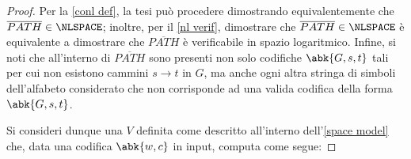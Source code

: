 \documentclass[a4paper, 12pt]{report}
\begin{document}
    \begin{proof}
        Per la \cref{conl def}, la tesi può procedere dimostrando equivalentemente che $\overline{PATH} \in \NLSPACE$; inoltre, per il \cref{nl verif}, dimostrare che $\overline{PATH} \in \NLSPACE$ è equivalente a dimostrare che $\overline{PATH}$ è verificabile in spazio logaritmico. Infine, si noti che all'interno di $\overline{PATH}$ sono presenti non solo codifiche $\abk{G, s, t}$ tali per cui non esistono cammini $s \to t$ in $G$, ma anche ogni altra stringa di simboli dell'alfabeto considerato che non corrisponde ad una valida codifica della forma $\abk{G, s, t}$. 

        Si consideri dunque una \TM $V$ definita come descritto all'interno dell'\cref{space model} che, data una codifica $\abk{w, c}$ in input, computa come segue:


\end{proof}
\end{document}
